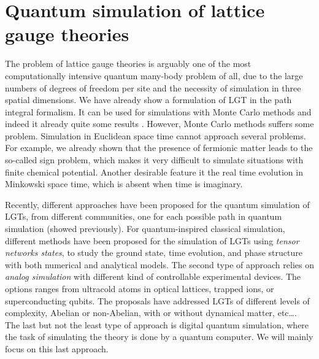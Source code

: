 \section{Quantum simulation of lattice gauge theories}
\label{sec:quantum_simulation_of_lattice_gauge_theories}

The problem of lattice gauge theories is arguably one of the most computationally intensive quantum many-body problem of all, due to the large numbers of degrees of freedom per site and the necessity of simulation in three spatial dimensions.
We have already show a formulation of LGT in the path integral formalism.
It can be used for simulations with Monte Carlo methods and indeed it already quite some results \citneeded.
However, Monte Carlo methods suffers some problem.
Simulation in Euclidean space time cannot approach several problems.
For example, we already shown that the presence of fermionic matter leads to the so-called sign problem, which makes it very difficult to simulate situations with finite chemical potential.
Another desirable feature it the real time evolution in Minkowski space time, which is absent when time is imaginary.

Recently, different approaches have been proposed for the quantum simulation of LGTs, from different communities, one for each possible path in quantum simulation (showed previously).
For quantum-inspired classical simulation, different methods have been proposed for the simulation of LGTs using \emph{tensor networks states}, to study the ground state, time evolution, and phase structure with both numerical and analytical models.
The second type of approach relies on \emph{analog simulation} with different kind of controllable experimental devices.
The options ranges from ultracold atoms in optical lattices\citneeded, trapped ions\citneeded, or superconducting qubits\citneeded.
The proposals have addressed LGTs of different levels of complexity, Abelian or non-Abelian, with or without dynamical matter, etc\dots.
The last but not the least type of approach is digital quantum simulation, where the task of simulating the theory is done by a quantum computer.
We will mainly focus on this last approach.

